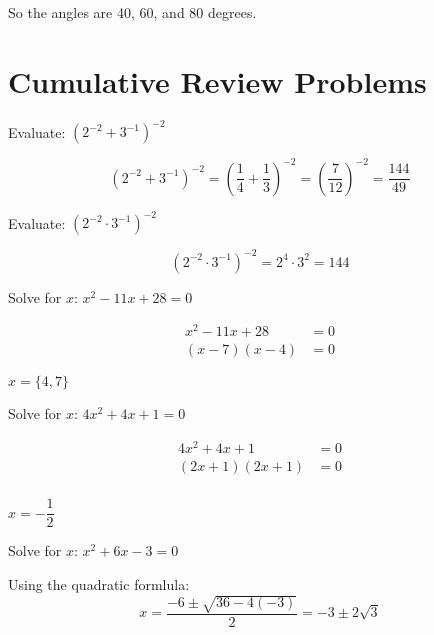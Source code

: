 \documentclass[fleqn,addpoints]{exam}
\begin{document}
\begin{description}
So the angles are 40, 60, and 80 degrees.

\end{description}

\section{Cumulative Review Problems}

\begin{questions}

\question 
Evaluate: $(2^{-2} + 3^{-1})^{-2}$

\begin{solution}
\[
  (2^{-2} + 3^{-1})^{-2} = \left( \frac{1}{4} + \frac{1}{3} \right)^{-2} = \left( \frac{7}{12} \right)^{-2} = \frac{144}{49}
\]
\end{solution}

\question 
Evaluate: $(2^{-2} \cdot 3^{-1})^{-2}$
\begin{solution}
\[
  (2^{-2} \cdot 3^{-1})^{-2} = 2^4 \cdot 3^2 = 144
\]
\end{solution}

\question 
Solve for $x$: $x^2-11x+28 = 0$
\begin{solution}
\begin{align*}
  x^2-11x+28 &= 0 \\
  (x-7)(x-4) &= 0 
\end{align*}

$x = \{4, 7\}$

\end{solution}

\pagebreak

\question 
Solve for $x$: $4x^2+4x+1 = 0$
\begin{solution}

\begin{align*}
  4x^2+4x+1 &= 0 \\
  (2x+1)(2x+1) &= 0 \\
\end{align*}

$x = - \dfrac{1}{2}$

\end{solution}

\question 
Solve for $x$: $x^2+6x-3 = 0$
\begin{solution}

Using the quadratic formlula:
\[
  x = \frac{-6 \pm \sqrt{36 - 4(-3)}}{2} = -3 \pm 2\sqrt{3}
\]
\end{solution}



\end{questions}
\end{document}
